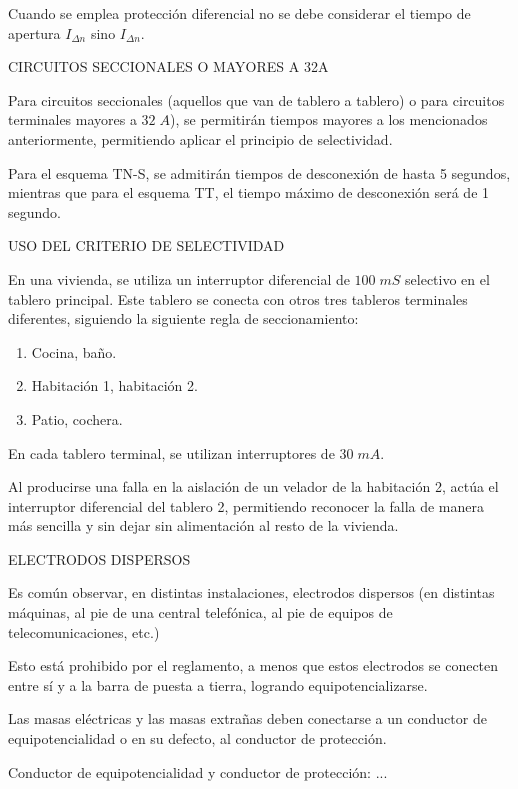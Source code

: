 Cuando se emplea protección diferencial no se debe considerar el tiempo de apertura $I_{\Delta n}$ sino $I_{\Delta n}$.

CIRCUITOS SECCIONALES O MAYORES A 32A

Para circuitos seccionales (aquellos que van de tablero a tablero) o para circuitos terminales mayores a $32\; A$), se permitirán tiempos mayores a los mencionados anteriormente, permitiendo aplicar el principio de selectividad.

Para el esquema TN-S, se admitirán tiempos de desconexión de hasta 5 segundos, mientras que para el esquema TT, el tiempo máximo de desconexión será de 1 segundo.

USO DEL CRITERIO DE SELECTIVIDAD
\begin{ejemplo}
	En una vivienda, se utiliza un interruptor diferencial de $100\; mS$ selectivo en el tablero principal. Este tablero se conecta con otros tres tableros terminales diferentes, siguiendo la siguiente regla de seccionamiento:
	\begin{enumerate}
		\item Cocina, baño.
		\item Habitación 1, habitación 2.
		\item Patio, cochera.
	\end{enumerate}
 	En cada tablero terminal, se utilizan interruptores de $30\; mA$.
 	
 	Al producirse una falla en la aislación de un velador de la habitación 2, actúa el interruptor diferencial del tablero 2, permitiendo reconocer la falla de manera más sencilla y sin dejar sin alimentación al resto de la vivienda.
\end{ejemplo}


ELECTRODOS DISPERSOS

Es común observar, en distintas instalaciones, electrodos dispersos (en distintas máquinas, al pie de una central telefónica, al pie de equipos de telecomunicaciones, etc.)

Esto está prohibido por el reglamento, a menos que estos electrodos se conecten entre sí y a la barra de puesta a tierra, logrando equipotencializarse.

Las masas eléctricas y las masas extrañas deben conectarse a un conductor de equipotencialidad o en su defecto, al conductor de protección.

Conductor de equipotencialidad y conductor de protección: ...

